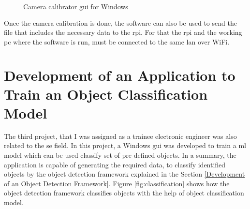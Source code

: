 \documentclass[a4paper,12pt]{report}%
\begin{document}
\begin{figure}[H]
	\centering
	\caption{Camera calibrator \ac{gui} for Windows}
	\label{fig:calibgui}
\end{figure}

Once the camera calibration is done, the software can also be used to send the file that includes the necessary data to the \ac{rpi}. For that the \ac{rpi} and the working \ac{pc} where the software is run,  must be connected to the same \ac{lan} over WiFi.

\pagebreak
\section{Development of an Application to Train an Object Classification Model}

The third project, that I was assigned as a trainee electronic engineer was also related to the \ac{se} field. In this project, a Windows \ac{gui} was developed to train a \ac{ml} model which can be used classify set of pre-defined objects. In a summary, the application is capable of generating the required data, to classify identified objects by the object detection framework explained in the Section \ref{Development of an Object Detection Framework}. Figure \ref{fig:classification} shows how the object detection framework classifies objects with the help of object classification model.
\end{document}
